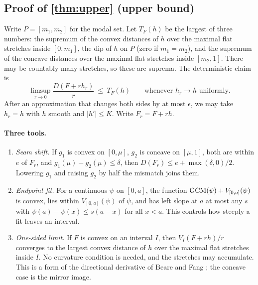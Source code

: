 \subsection{Proof of \cref{thm:upper} (upper bound)}


Write $P=[m_1,m_2]$ for the modal set. Let $T_F(h)$ be the largest of three numbers: the supremum of the convex distances of $h$ over the maximal flat stretches inside $[0,m_1]$, the dip of $h$ on $P$ (zero if $m_1=m_2$), and the supremum of the concave distances over the maximal flat stretches inside $[m_2,1]$. There may be countably many stretches, so these are suprema. The deterministic claim is
\[
\limsup_{r\to0}\frac{D(F+rh_r)}{r}\ \le\ T_F(h)\qquad\text{whenever }h_r\to h\text{ uniformly}.
\]
After an approximation that changes both sides by at most $\epsilon$, we may take $h_r=h$ with $h$ smooth and $|h'|\le K$. Write $F_r=F+rh$.

\paragraph{Three tools.}
\begin{enumerate}[label=(T\arabic*),leftmargin=*,itemsep=4pt]
\item \emph{Seam shift.} If $g_1$ is convex on $[0,\mu]$, $g_2$ is concave on $[\mu,1]$, both are within $e$ of $F_r$, and $g_1(\mu)-g_2(\mu)\le\delta$, then $D(F_r)\le e+\max(\delta,0)/2$. Lowering $g_1$ and raising $g_2$ by half the mismatch joins them.
\item \emph{Endpoint fit.} For a continuous $\psi$ on $[0,a]$, the function $\operatorname{GCM}(\psi)+V_{[0,a]}(\psi)$ is convex, lies within $V_{[0,a]}(\psi)$ of $\psi$, and has left slope at $a$ at most any $s$ with $\psi(a)-\psi(x)\le s(a-x)$ for all $x<a$. This controls how steeply a fit leaves an interval.
\item \emph{One-sided limit.} If $F$ is convex on an interval $I$, then $V_I(F+rh)/r$ converges to the largest convex distance of $h$ over the maximal flat stretches inside $I$. No curvature condition is needed, and the stretches may accumulate. This is a form of the directional derivative of Beare and Fang \cite{BF17}; the concave case is the mirror image.
\end{enumerate}

